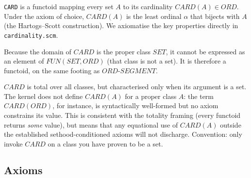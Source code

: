 \texttt{CARD} is a functoid mapping every set $A$ to its cardinality
$\mathit{CARD}(A) \in \mathit{ORD}$.  Under the axiom of choice,
$\mathit{CARD}(A)$ is the least ordinal $\alpha$ that bijects with $A$
(the Hartogs--Scott construction).  We axiomatise the key properties
directly in \texttt{cardinality.scm}.

\begin{remark}
Because the domain of $\mathit{CARD}$ is the proper class $\mathit{SET}$,
it cannot be expressed as an element of $\mathit{FUN}(\mathit{SET}, \mathit{ORD})$
(that class is not a set).  It is therefore a functoid, on the same
footing as $\mathit{ORD\text{-}SEGMENT}$.
\end{remark}

\begin{remark}
$\mathit{CARD}$ is total over all classes, but characterised only when
its argument is a set.  The kernel does not define $\mathit{CARD}(A)$
for a proper class $A$: the term $\mathit{CARD}(\mathit{ORD})$, for
instance, is syntactically well-formed but no axiom constrains its
value.  This is consistent with the totality framing (every functoid
returns \emph{some} value), but means that any equational use of
$\mathit{CARD}(A)$ outside the established sethood-conditioned axioms
will not discharge.  Convention: only invoke $\mathit{CARD}$ on a
class you have proven to be a set.
\end{remark}

\subsection*{Axioms}

